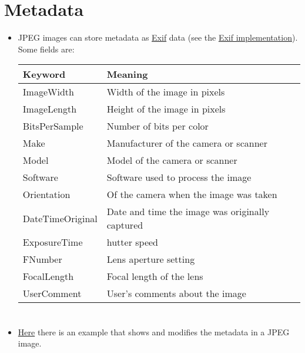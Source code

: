 \section{Metadata}
\begin{itemize}
\item \gls{JPEG} images can store metadata as
  \href{https://en.wikipedia.org/wiki/Exif}{Exif} data (see the \href{https://gitlab.com/TNThieding/exif/-/blob/master/docs/api_reference.rst?ref_type=heads}{Exif implementation}). Some fields are:
  \vspace{-2ex}
  \begin{center}
    \begin{tabular}{l|l}
      Keyword & Meaning\\
      \hline
      ImageWidth & Width of the image in pixels \\
      ImageLength & Height of the image in pixels \\
      BitsPerSample&  Number of bits per color \\
      Make & Manufacturer of the camera or scanner \\
      Model & Model of the camera or scanner \\
      Software & Software used to process the image \\
      Orientation & Of the camera when the image was taken \\
      DateTimeOriginal & Date and time the image was originally captured \\
      ExposureTime & hutter speed \\
      FNumber & Lens aperture setting \\
      FocalLength & Focal length of the lens \\
      UserComment & User's comments about the image
    \end{tabular}
  \end{center}
\end{itemize}

\section*{}
\begin{itemize}
\item
  \href{https://github.com/vicente-gonzalez-ruiz/medical_imaging/blob/main/notebooks/JPEG_add_metadata.ipynb}{Here}
  there is an example that shows and modifies the metadata in a JPEG
  image.
\end{itemize}
